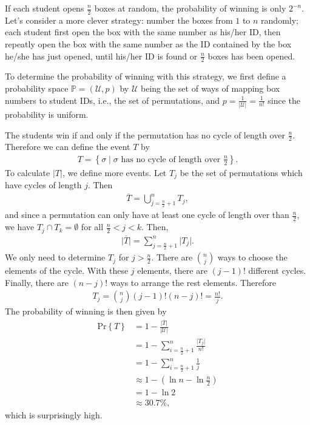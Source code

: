 \documentclass{scribe}
\newcommand{\prob}[1]{\mathrm{Pr} \left\{ #1 \right\}}
\begin{document}
If each student opens $\frac{n}{2}$ boxes at random, the probability of winning is only $2^{-n}$. Let's consider a more clever strategy: number the boxes from $1$ to $n$ randomly; each student first open the box with the same number as his/her ID, then repeatly open the box with the same number as the ID contained by the box he/she has just opened, until his/her ID is found or $\frac{n}{2}$ boxes has been opened.

To determine the probability of winning with this strategy, we first define a probability space $\mathbb{P} = (\mathcal{U}, p)$ by $\mathcal{U}$ being the set of ways of mapping box numbers to student IDs, i.e., the set of permutations, and $p = \frac{1}{\lvert \mathcal{U} \rvert} = \frac{1}{n!}$ since the probability is uniform.

The students win if and only if the permutation has no cycle of length over $\frac{n}{2}$. Therefore we can define the event $T$ by
\begin{align*}
  T = \left\{\sigma \mid \sigma \text{ has no cycle of length over } \frac{n}{2} \right\}.
\end{align*}
To calculate $\lvert T \rvert$, we define more events. Let $T_j$ be the set of permutations which have cycles of length $j$. Then
\begin{align*}
  \overline{T} = \bigcup_{j=\frac{n}{2}+1}^{n} T_j,
\end{align*}
and since a permutation can only have at least one cycle of length over than $\frac{n}{2}$, we have $T_j \cap T_k = \emptyset$ for all $\frac{n}{2} < j < k$. Then,
\begin{align*}
  \lvert \overline{T} \rvert = \sum_{j=\frac{n}{2}+1}^n \lvert T_j \rvert.
\end{align*}
We only need to determine $T_j$ for $j > \frac{n}{2}$. There are $\binom{n}{j}$ ways to choose the elements of the cycle. With these $j$ elements, there are $(j-1)!$ different cycles. Finally, there are $(n-j)!$ ways to arrange the rest elements. Therefore
\begin{align*}
  T_j = \binom{n}{j} (j-1)! (n-j)! = \frac{n!}{j}.
\end{align*}
The probability of winning is then given by
\begin{align*}
  \prob{T} &= 1 - \frac{\lvert \overline{T} \rvert}{\lvert \mathcal{U} \rvert} \\
           &= 1 - \sum_{i=\frac{n}{2}+1}^{n} \frac{\lvert T_j \rvert}{n!} \\
           &= 1 - \sum_{i=\frac{n}{2}+1}^{n} \frac{1}{j} \\
           &\approx 1 - (\ln n - \ln \frac{n}{2}) \\
           &= 1 - \ln 2 \\
           &\approx 30.7\%,
\end{align*}
which is surprisingly high. 
\end{document}
